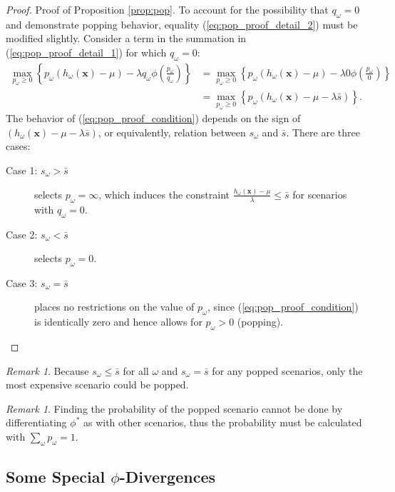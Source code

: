 \documentclass[12pt]{article}
\newcommand{\x}{\mathbf{x}}
\theoremstyle{plain}
\theoremstyle{definition}
\theoremstyle{remark}
\newtheorem{remark}[theorem]{Remark}
\begin{document}
\begin{proof}{\sc Proof of Proposition \ref{prop:pop}.}
	To account for the possibility that $q_\omega = 0$ and demonstrate popping behavior, equality (\ref{eq:pop_proof_detail_2}) must be modified slightly.
	Consider a term in the summation in (\ref{eq:pop_proof_detail_1}) for which $q_\omega = 0$:
	\begin{align}
		\max_{p_\omega \geq 0} \left\{ p_\omega (h_\omega(\x) - \mu) - \lambda q_\omega  \phi\left(\frac{p_\omega}{q_\omega}\right) \right\} & = \max_{p_\omega \geq 0} \left\{ p_\omega (h_\omega(\x) - \mu) - \lambda 0  \phi\left(\frac{p_\omega}{0}\right) \right\} \nonumber \\
		& = \max_{p_\omega \geq 0} \left\{ p_\omega \left( h_\omega(\x) - \mu - \lambda \bar{s} \right) \right\}. \label{eq:pop_proof_condition}
	\end{align}
	The behavior of (\ref{eq:pop_proof_condition}) depends on the sign of $\left( h_\omega(\x) - \mu - \lambda \bar{s}  \right)$, or equivalently, relation between $s_\omega$ and $\bar{s}$.
	There are three cases:
	\begin{description}
		\item[Case 1: $s_\omega > \bar{s}$] selects $p_\omega = \infty$, which induces the constraint $\frac{h_\omega(\x) - \mu}{\lambda} \leq \bar{s}$ for scenarios with $q_\omega = 0$.
		\item[Case 2: $s_\omega < \bar{s}$] selects $p_\omega = 0$.
		\item[Case 3: $s_\omega = \bar{s}$] places no restrictions on the value of $p_\omega$, since (\ref{eq:pop_proof_condition}) is identically zero and hence allows for $p_\omega > 0$ (popping). \Halmos
	\end{description}
\end{proof}

\begin{remark}
	Because $s_\omega \leq \bar{s}$ for all $\omega$ and $s_\omega = \bar{s}$ for any popped scenarios, only the most expensive scenario could be popped.
\end{remark}

\begin{remark}
	Finding the probability of the popped scenario cannot be done by differentiating $\phi^*$ as with other scenarios, thus the probability must be calculated with $\sum_\omega p_\omega = 1$.
\end{remark}

\subsection{Some Special $\phi$-Divergences}
\label{ssec:special_phi}
\end{document}
